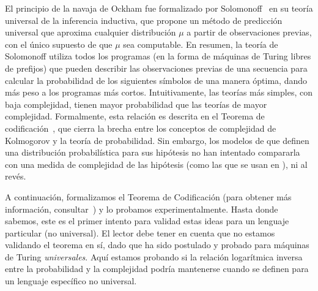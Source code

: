 El principio de la navaja de Ockham fue formalizado por Solomonoff~\cite{solomonoff1964formal} en su teoría universal de la inferencia inductiva, que propone un método de predicción universal que aproxima cualquier distribución $\mu$ a partir de observaciones previas, con el único supuesto de que $\mu$ sea computable. En resumen, la teoría de Solomonoff utiliza todos los programas (en la forma de máquinas de Turing libres de prefijos) que pueden describir las observaciones previas de una secuencia para calcular la probabilidad de los siguientes símbolos de una manera óptima, dando más peso a los programas más cortos. Intuitivamente, las teorías más simples, con baja complejidad, tienen mayor probabilidad que las teorías de mayor complejidad. Formalmente, esta relación es descrita en el Teorema de codificación~\cite{levin1974laws}, que cierra la brecha entre los conceptos de complejidad de Kolmogorov y la teoría de probabilidad. Sin embargo, los modelos de \lot que definen una distribución probabilística para sus hipótesis no han intentado compararla con una medida de complejidad de las hipótesis (como las que se usan en \mdlgeo), ni al revés.


A continuación, formalizamos el Teorema de Codificación (para obtener más información, consultar~\cite{li2013introduction}) y lo probamos experimentalmente. Hasta donde sabemos, este es el primer intento para validad estas ideas para un lenguaje particular (no universal). El lector debe tener en cuenta que no estamos validando el teorema en sí, dado que ha sido postulado y probado para máquinas de Turing {\em universales}. Aquí estamos probando si la relación logarítmica inversa entre la probabilidad y la complejidad podría mantenerse cuando se definen para un lenguaje específico no universal.

